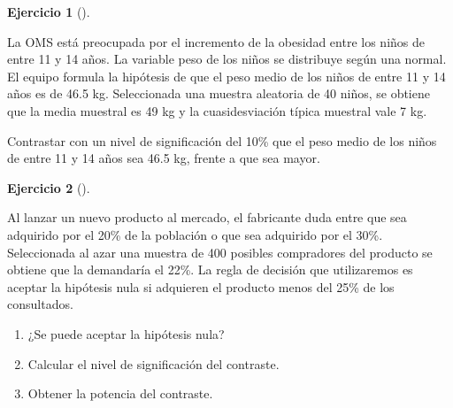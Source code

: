 \documentclass[
  a4paper,
]{scrreport}
\theoremstyle{definition}
\newtheorem{exercise}{Ejercicio}[chapter]
\theoremstyle{remark}
\begin{document}
\begin{exercise}[]\protect\hypertarget{exr-contraste-media-peso}{}\label{exr-contraste-media-peso}

La OMS está preocupada por el incremento de la obesidad entre los niños
de entre 11 y 14 años. La variable peso de los niños se distribuye según
una normal. El equipo formula la hipótesis de que el peso medio de los
niños de entre 11 y 14 años es de 46.5 kg. Seleccionada una muestra
aleatoria de 40 niños, se obtiene que la media muestral es 49 kg y la
cuasidesviación típica muestral vale 7 kg.

Contrastar con un nivel de significación del 10\% que el peso medio de
los niños de entre 11 y 14 años sea 46.5 kg, frente a que sea mayor.

\end{exercise}

\begin{exercise}[]\protect\hypertarget{exr-contraste-proporcion-consumo-producto}{}\label{exr-contraste-proporcion-consumo-producto}

Al lanzar un nuevo producto al mercado, el fabricante duda entre que sea
adquirido por el 20\% de la población o que sea adquirido por el 30\%.
Seleccionada al azar una muestra de 400 posibles compradores del
producto se obtiene que la demandaría el 22\%. La regla de decisión que
utilizaremos es aceptar la hipótesis nula si adquieren el producto menos
del 25\% de los consultados.

\begin{enumerate}
\def\labelenumi{\alph{enumi}.}
\item
  ¿Se puede aceptar la hipótesis nula?
\item
  Calcular el nivel de significación del contraste.
\item
  Obtener la potencia del contraste.
\end{enumerate}

\end{exercise}
\end{document}
